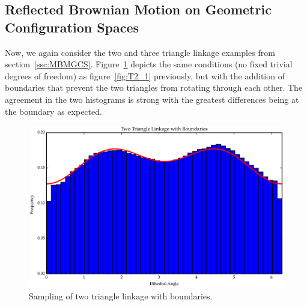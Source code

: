 \subsection{Reflected Brownian Motion on Geometric Configuration Spaces}
Now, we again consider the two and three triangle linkage examples from section~\ref{ssc:MBMGCS}. Figure~\ref{fig:T2_2} depicts the same conditions (no fixed trivial degrees of freedom) as figure~\ref{fig:T2_1} previously, but with the addition of boundaries that prevent the two triangles from rotating through each other. The agreement in the two histograms is strong with the greatest differences being at the boundary as expected. 
\begin{figure}[ht]
\centering
  \includegraphics[scale=0.6]{images/T2_2.eps}
\caption{Sampling of two triangle linkage with boundaries.}
\label{fig:T2_2}
\end{figure}

